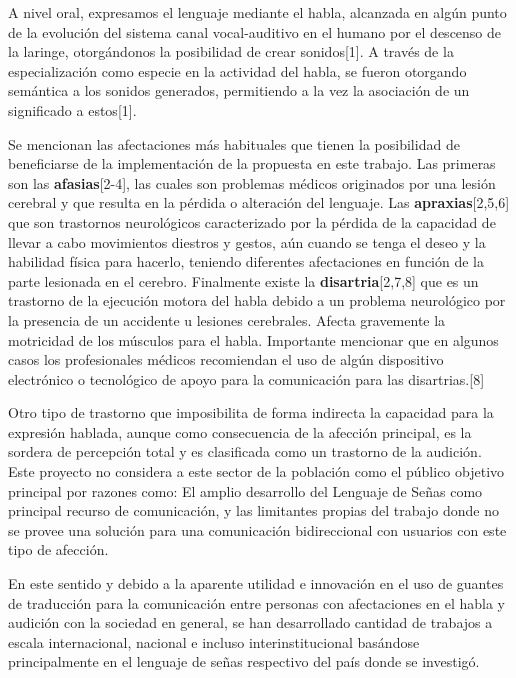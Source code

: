 \hfill \break
\justifying
A nivel oral, expresamos el lenguaje mediante el habla, alcanzada en algún punto de la evolución del sistema canal vocal-auditivo en el humano por el descenso de la laringe, otorgándonos la posibilidad de crear sonidos[1]. A través de la especialización como especie en la actividad del habla, se fueron otorgando semántica a los sonidos generados, permitiendo a la vez la asociación de un significado a estos[1].

\hfill \break
\justifying
Se mencionan las afectaciones más habituales que tienen la posibilidad de beneficiarse de la implementación de la propuesta en este trabajo. Las primeras son las \textbf{afasias}[2-4], las cuales son problemas médicos originados por una lesión cerebral y que resulta en la pérdida o alteración del lenguaje.  Las \textbf{apraxias}[2,5,6] que son trastornos neurológicos caracterizado por la pérdida de la capacidad de llevar a cabo movimientos diestros y gestos, aún cuando se tenga el deseo y la habilidad física para hacerlo, teniendo diferentes afectaciones en función de la parte lesionada en el cerebro. Finalmente existe la \textbf{disartria}[2,7,8] que es un trastorno de la ejecución motora del habla debido a un problema neurológico por la presencia de un accidente u lesiones cerebrales. Afecta gravemente la motricidad de los músculos para el habla. Importante mencionar que en algunos casos los profesionales médicos recomiendan el uso de algún dispositivo electrónico o tecnológico de apoyo para la comunicación para las disartrias.[8]

\hfill \break
\justifying
Otro tipo de trastorno que imposibilita de forma indirecta la capacidad para la expresión hablada, aunque como consecuencia de la afección principal, es la sordera de percepción total y es clasificada como un trastorno de la audición. Este proyecto no considera a este sector de la población como el público objetivo principal por razones como: El amplio desarrollo del Lenguaje de Señas como principal recurso de comunicación, y las limitantes propias del trabajo donde no se provee una solución para una comunicación bidireccional con usuarios con este tipo de afección.


\hfill \break
\justifying
En este sentido y debido a la aparente utilidad e innovación en el uso de guantes de traducción para la comunicación entre personas con afectaciones en el habla y audición con la sociedad en general, se han desarrollado cantidad de trabajos a escala internacional, nacional e incluso interinstitucional basándose principalmente en el lenguaje de señas respectivo del país donde se investigó.

